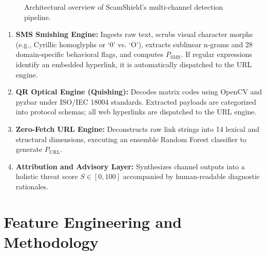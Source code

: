 \documentclass[conference]{IEEEtran}
\begin{document}
\begin{figure}[htbp]
\centerline{}
\caption{Architectural overview of ScamShield's multi-channel detection pipeline.}
\label{fig:arch}
\end{figure}

\begin{enumerate}
    \item \textbf{SMS Smishing Engine:} Ingests raw text, scrubs visual character morphs (e.g., Cyrillic homoglyphs or `0' vs. `O'), extracts sublinear n-grams and 28 domain-specific behavioral flags, and computes $P_{\text{SMS}}$. If regular expressions identify an embedded hyperlink, it is automatically dispatched to the URL engine.
    \item \textbf{QR Optical Engine (Quishing):} Decodes matrix codes using OpenCV and pyzbar under ISO/IEC 18004 standards. Extracted payloads are categorized into protocol schemas; all web hyperlinks are dispatched to the URL engine.
    \item \textbf{Zero-Fetch URL Engine:} Deconstructs raw link strings into 14 lexical and structural dimensions, executing an ensemble Random Forest classifier to generate $P_{\text{URL}}$.
    \item \textbf{Attribution and Advisory Layer:} Synthesizes channel outputs into a holistic threat score $S \in [0, 100]$ accompanied by human-readable diagnostic rationales.
\end{enumerate}

\section{Feature Engineering and Methodology}
\end{document}
